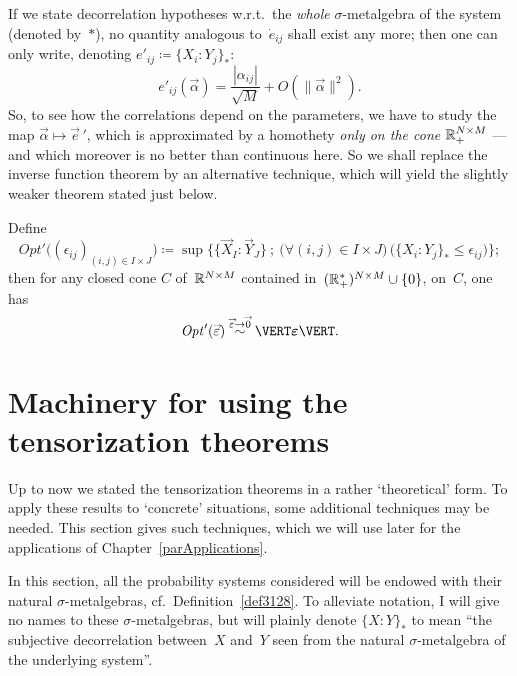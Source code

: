 \begin{Rmk}
If we state decorrelation hypotheses
w.r.t.\ the \emph{whole} $\sigma$-metalgebra of the system (denoted by~$*$),
no quantity analogous to~$\dot{e}_{ij}$ shall exist any more;
then one can only write, denoting $e'_{ij} \coloneqq \{X_i:Y_j\}_{*}$:
\[ e'_{ij} (\vec\alpha) = \frac{|\alpha_{ij}|}{\sqrt{M}} + O(\|\vec\alpha\|^2) .\]
So, to see how the correlations depend on the parameters,
we have to study the map $\vec\alpha\mapsto\vec{e}\,'$,
which is approximated by a homothety \emph{only on the cone $\mathbb{R}^{N\times M}_+$}
—and which moreover is no better than continuous here.
So we shall replace the inverse function theorem by an alternative technique,
which will yield the slightly weaker theorem stated just below.
\end{Rmk}
%
\begin{Thm}
Define
\[ \mathit{Opt}' \big( (\epsilon_{ij})_{(i,j)\in I\times J} \big)
\coloneqq \sup \Big\{ \big\{ \vec{X}_I : \vec{Y}_J \big\} \ ;\ \big(\forall (i,j) \in I\times J\big) \,
\big(\{ X_i:Y_j \}_* \leq \epsilon_{ij}\big) \Big\} ;\]
then for any closed cone $C$ of~$\mathbb{R}^{N\times M}$
contained in~$(\mathbb{R}_+^*)^{N\times M} \cup \{0\}$,
on~$C$, one has
\[ \mathit{Opt}'(\vec{\epsilon}) \stackrel{\vec\epsilon\longto\vec0}\sim
\VERT \boldepsilon \VERT .\]
\end{Thm}




\section{Machinery for using the tensorization theorems}%
\label{parMachineryForUsingTheTensorizationTheorems}

Up to now we stated the tensorization theorems in a rather `theoretical' form.
To apply these results to `concrete' situations, some additional techniques may be needed.
This section gives such techniques, which we will use later for the applications
of Chapter~\ref{parApplications}.

\begin{NOTA}
In this section, all the probability systems considered
will be endowed with their natural $\sigma$-metalgebras,
cf.\ Definition~\ref{def3128}.
To alleviate notation, I will give no names to these $\sigma$-metalgebras,
but will plainly denote ${\{X:Y\}}_*$ to mean
``the subjective decorrelation between~$X$ and~$Y$
seen from the natural $\sigma$-metalgebra of the underlying system''.
\end{NOTA}


